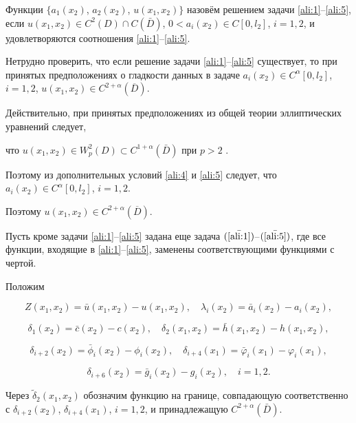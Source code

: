\smallskip

\begin{definition}[1]Функции $\{a_1(x_2)$, $a_2(x_2)$, $u(x_1,x_2)\}$ назовём решением задачи \eqref{ali:1}--\eqref{ali:5}, если $u(x_1,x_2)\in C^2(D)\cap C(\bar{D})$, $0<a_i(x_2)\in C[0, l_2]$, $i=1, 2$,  и удовлетворяются соотношения \eqref{ali:1}--\eqref{ali:5}.

\end{definition}



\smallskip



Нетрудно проверить, что если решение задачи \eqref{ali:1}--\eqref{ali:5} существует, то при принятых предположениях о гладкости данных в задаче $a_i(x_2)\in C^\alpha[0, l_2]$, $i=1, 2$, $u(x_1, x_2)\in C^{2+\alpha}(\overline D)$. 

Действительно, при принятых предположениях из общей теории эллиптических уравнений следует, 

что $u(x_1,x_2)\in W_p^2(D)\subset C^{1+\alpha}(\bar{D})$ при $p>2$ \cite[c.~283]{ali:bib:24}. 

Поэтому из дополнительных условий \eqref{ali:4} и \eqref{ali:5} следует, что $a_i(x_2)\in C^\alpha[0, l_2]$, $i=1, 2$. 

Поэтому $u(x_1,x_2)\in C^{2+\alpha}(\overline D)$. 



\smallskip




Пусть кроме задачи \eqref{ali:1}--\eqref{ali:5} задана еще задача $(\bar{\text{\ref{ali:1}}})$--$(\bar{\text{\ref{ali:5}}})$, где все функции, входящие в \eqref{ali:1}--\eqref{ali:5}, заменены соответствующими функциями с чертой. 

Положим 

$$Z(x_1, x_2)=\bar u(x_1,x_2)-u(x_1,x_2), \quad \lambda_i(x_2)=\bar{a}_i(x_2)-a_i(x_2),$$ 

$$\delta_1(x_2)=\bar{c}(x_2)-c(x_2),\quad  \delta_2(x_1,x_2)=\bar h(x_1,x_2)-h(x_1,x_2),$$ 

$$\delta_{i+2}(x_2)=\bar{\phi}_i(x_2)-\phi_i(x_2), \quad \delta_{i+4}(x_1)=\bar{\varphi}_i(x_1)-\varphi_i(x_1),$$ 

$$\delta_{i+6}(x_2)=\bar{g}_i(x_2)-g_i(x_2 ),\quad i=1, 2.$$



Через $\tilde{\delta}_2(x_1,x_2)$ обозначим функцию на границе, совпадающую соответственно с $\delta_{i+2}(x_2)$, $\delta_{i+4}(x_1)$, $i=1, 2$, и принадлежащую $C^{2+\alpha}(\bar{D})$.



